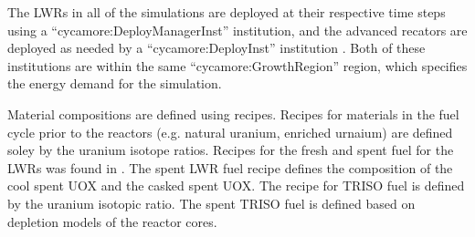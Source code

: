 The \glspl{LWR} in all of the simulations are deployed 
at their respective time steps using a ``cycamore:DeployManagerInst'' institution, 
and the advanced recators are deployed as needed by a ``cycamore:DeployInst''
institution \cite{scopatz_cyclus_2015}. Both of these institutions are within the same 
``cycamore:GrowthRegion'' region, which specifies the energy demand for the simulation.

Material compositions are defined using recipes. Recipes for materials in the fuel 
cycle prior to the reactors (e.g. natural uranium, enriched urnaium) are defined 
soley by the uranium isotope ratios. Recipes for the fresh and 
spent fuel for the \glspl{LWR} was found in \cite{yacout_visionverifiable_2006}.
The spent \gls{LWR} fuel recipe defines the composition of the cool spent UOX and 
the casked spent UOX. The recipe for \gls{TRISO} fuel is defined by the uranium 
isotopic ratio. The spent \gls{TRISO} fuel is defined based on depletion models of 
the reactor cores.  

